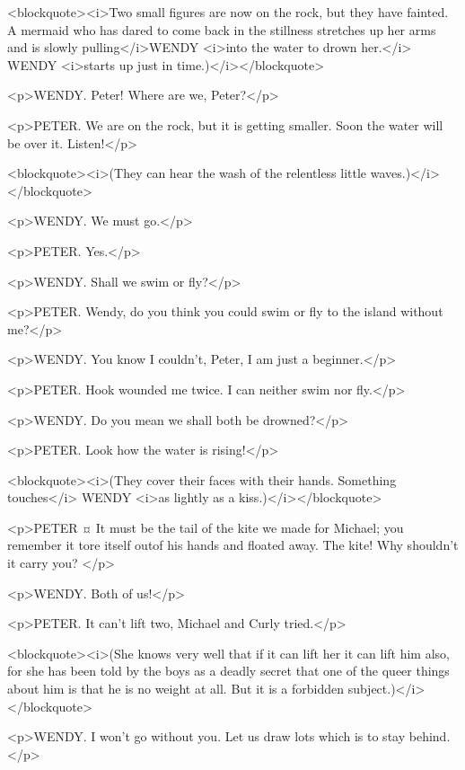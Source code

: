 <blockquote><i>Two small figures are now on the rock, but they have fainted. A mermaid who has dared to come back in the stillness stretches up her arms and is slowly pulling</i>WENDY <i>into the water to drown her.</i> WENDY <i>starts up just in time.)</i></blockquote>

<p>WENDY. Peter!
Where are we, Peter?</p>

<p>PETER. We are on the rock, but it is getting smaller. Soon the water will be over it. Listen!</p>

<blockquote><i>(They can hear the wash of the relentless little waves.)</i></blockquote>

<p>WENDY. We must go.</p>

<p>PETER. Yes.</p>

<p>WENDY. Shall we swim or fly?</p>

<p>PETER. Wendy, do you think you could swim or fly to the island without me?</p>

<p>WENDY. You know I couldn't, Peter, I am just a beginner.</p>

<p>PETER. Hook wounded me twice.
I can neither swim nor fly.</p>

<p>WENDY. Do you mean we shall both be drowned?</p>

<p>PETER. Look how the water is rising!</p>

<blockquote><i>(They cover their faces with their hands. Something touches</i> WENDY <i>as lightly as a kiss.)</i></blockquote>

<p>PETER ¤
It must be the tail of the kite we made for Michael; you remember it tore itself outof his hands and floated away.
The kite! Why shouldn't it carry you?
</p>

<p>WENDY. Both of us!</p>

<p>PETER. It can't lift two, Michael and Curly tried.</p>

<blockquote><i>(She knows very well that if it can lift her it can lift him also, for she has been told by the boys as a deadly secret that one of the queer things about him is that he is no weight at all. But it is a forbidden subject.)</i></blockquote>

<p>WENDY. I won't go without you. Let us draw lots which is to stay behind.</p>

